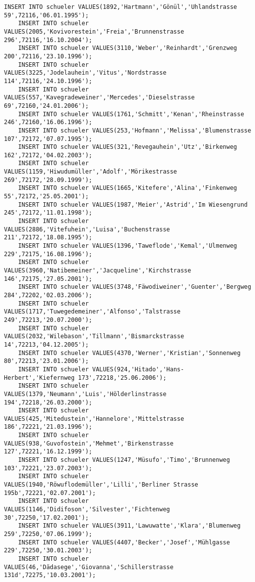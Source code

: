 \begin{lstlisting}[breaklines=True, numbers=none, basicstyle=\tiny, keepspaces=false]
	INSERT INTO schueler VALUES(1892,'Hartmann','Gönül','Uhlandstrasse 59',72116,'06.01.1995');
	INSERT INTO schueler VALUES(2005,'Kovivorestein','Freia','Brunnenstrasse 296',72116,'16.10.2004');
	INSERT INTO schueler VALUES(3110,'Weber','Reinhardt','Grenzweg 200',72116,'23.10.1996');
	INSERT INTO schueler VALUES(3225,'Jodelauhein','Vitus','Nordstrasse 114',72116,'24.10.1996');
	INSERT INTO schueler VALUES(557,'Kavegradeweiner','Mercedes','Dieselstrasse 69',72160,'24.01.2006');
	INSERT INTO schueler VALUES(1761,'Schmitt','Kenan','Rheinstrasse 246',72160,'16.06.1996');
	INSERT INTO schueler VALUES(253,'Hofmann','Melissa','Blumenstrasse 107',72172,'07.07.1995');
	INSERT INTO schueler VALUES(321,'Revegauhein','Utz','Birkenweg 162',72172,'04.02.2003');
	INSERT INTO schueler VALUES(1159,'Hiwudumüller','Adolf','Mörikestrasse 269',72172,'28.09.1999');
	INSERT INTO schueler VALUES(1665,'Kitefere','Alina','Finkenweg 55',72172,'25.05.2001');
	INSERT INTO schueler VALUES(1987,'Meier','Astrid','Im Wiesengrund 245',72172,'11.01.1998');
	INSERT INTO schueler VALUES(2886,'Vitefuhein','Luisa','Buchenstrasse 211',72172,'18.08.1995');
	INSERT INTO schueler VALUES(1396,'Taweflode','Kemal','Ulmenweg 229',72175,'16.08.1996');
	INSERT INTO schueler VALUES(3960,'Natibemeiner','Jacqueline','Kirchstrasse 146',72175,'27.05.2001');
	INSERT INTO schueler VALUES(3748,'Fäwodiweiner','Guenter','Bergweg 284',72202,'02.03.2006');
	INSERT INTO schueler VALUES(1717,'Tuwegedemeiner','Alfonso','Talstrasse 249',72213,'20.07.2000');
	INSERT INTO schueler VALUES(2032,'Wilebason','Tillmann','Bismarckstrasse 14',72213,'04.12.2005');
	INSERT INTO schueler VALUES(4370,'Werner','Kristian','Sonnenweg 80',72213,'23.01.2006');
	INSERT INTO schueler VALUES(924,'Hitado','Hans-Herbert','Kiefernweg 173',72218,'25.06.2006');
	INSERT INTO schueler VALUES(1379,'Neumann','Luis','Hölderlinstrasse 194',72218,'26.03.2000');
	INSERT INTO schueler VALUES(425,'Mitedustein','Hannelore','Mittelstrasse 186',72221,'21.03.1996');
	INSERT INTO schueler VALUES(938,'Guvofostein','Mehmet','Birkenstrasse 127',72221,'16.12.1999');
	INSERT INTO schueler VALUES(1247,'Müsufo','Timo','Brunnenweg 103',72221,'23.07.2003');
	INSERT INTO schueler VALUES(1940,'Röwuflodemüller','Lilli','Berliner Strasse 195b',72221,'02.07.2001');
	INSERT INTO schueler VALUES(1146,'Didifoson','Silvester','Fichtenweg 30',72250,'17.02.2001');
	INSERT INTO schueler VALUES(3911,'Lawuwatte','Klara','Blumenweg 259',72250,'07.06.1999');
	INSERT INTO schueler VALUES(4407,'Becker','Josef','Mühlgasse 229',72250,'30.01.2003');
	INSERT INTO schueler VALUES(46,'Dädasege','Giovanna','Schillerstrasse 131d',72275,'10.03.2001');

\end{lstlisting}
